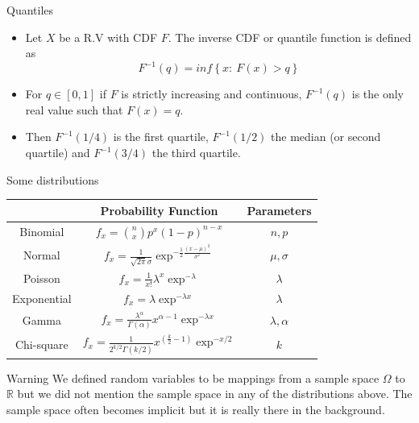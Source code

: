 \documentclass[handout]{beamer}
\begin{document}
\begin{frame}{Quantiles}
\scriptsize{
\begin{itemize}
 \item Let $X$ be a R.V with CDF $F$. The inverse CDF or quantile function is defined as \begin{displaymath}
                                                                                   F^{-1}(q)= inf \left\{ x: \ F(x) > q \right\}
                                                                                     \end{displaymath}
 \item For $q \in [0,1]$ if $F$ is strictly increasing and continuous, $F^{-1}(q)$ is the only real value such that $F(x)=q$.
 \item Then $F^{-1}(1/4)$ is the first quartile, $F^{-1}(1/2)$ the median (or second quartile) and $F^{-1}(3/4)$ the third quartile.
 
 
\end{itemize}

}

\end{frame}




\begin{frame}{Some distributions}
\scriptsize{ 

\begin{table}
\centering
\begin{tabular}{c|c|c}
\hline
  & Probability Function & Parameters   \\ 
\hline
Binomial & $f_x= {n \choose x}p^{x}(1-p)^{n-x} $ & $n,p$ \\ \hline
Normal & $f_x=\frac{1}{\sqrt{2\pi}\sigma}\exp^{-\frac{1}{2}\frac{(x-\mu)^2}{\sigma^{2}}}$ & $\mu, \sigma$ \\ \hline
Poisson & $f_x=\frac{1}{x!}\lambda^{x}\exp^{-\lambda}$ & $\lambda$ \\ \hline
Exponential & $f_x= \lambda \exp^{-\lambda x}$  & $\lambda$ \\ \hline
Gamma & $f_x= \frac{\lambda^{\alpha}}{\Gamma(\alpha)} x^{\alpha -1}\exp^{-\lambda x} $ & $\lambda , \alpha$ \\ \hline
Chi-square & $f_x=\frac{1}{2^{k/2} \Gamma(k/2)} x^{(\frac{k}{2} -1)} \exp^{-x/2} $  & $k$  \\
\hline
\end{tabular}
\end{table}

\begin{block}{Warning}
We defined random variables to be mappings from a sample space $\Omega$ to $\mathbb{R}$ but we did not mention the sample space in any of the distributions above. The sample space often becomes implicit but it is really there in the background. 
\end{block}



}
\end{frame}
\end{document}
